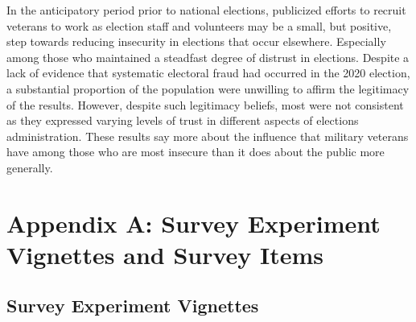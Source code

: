 \documentclass[
  12pt,
  letterpaper,
]{article}
\begin{document}
In the anticipatory period prior to national elections, publicized
efforts to recruit veterans to work as election staff and volunteers may
be a small, but positive, step towards reducing insecurity in elections
that occur elsewhere. Especially among those who maintained a steadfast
degree of distrust in elections. Despite a lack of evidence that
systematic electoral fraud had occurred in the 2020 election, a
substantial proportion of the population were unwilling to affirm the
legitimacy of the results. However, despite such legitimacy beliefs,
most were not consistent as they expressed varying levels of trust in
different aspects of elections administration. These results say more
about the influence that military veterans have among those who are most
insecure than it does about the public more generally.

\newpage{}

\section{Appendix A: Survey Experiment Vignettes and Survey
Items}\label{appendix-a-survey-experiment-vignettes-and-survey-items}

\subsection{Survey Experiment
Vignettes}\label{survey-experiment-vignettes}
\end{document}
